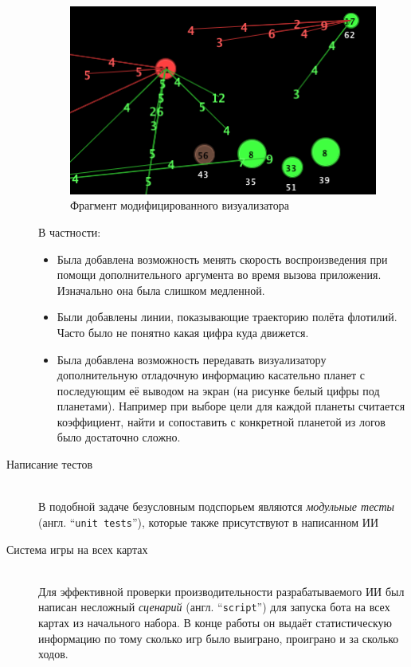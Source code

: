 \documentclass[12pt]{report}
\newenvironment{myItemize}{
	\begin{itemize}
  		\setlength{\itemsep}{1pt}
  		\setlength{\parskip}{0pt}
  		\setlength{\parsep}{0pt}
}{\end{itemize}}
\begin{document}
\begin{description}
\begin{figure}[h]
	\centering
	\includegraphics[scale=1]{modified_viz}
	\caption{Фрагмент модифицированного визуализатора}
	\label{fig:modif_viz}
\end{figure}
В частности: 
	\begin{myItemize}
	\item Была добавлена возможность менять скорость воспроизведения при помощи дополнительного аргумента во время вызова приложения. Изначально она была слишком медленной.
	\item Были добавлены линии, показывающие траекторию полёта флотилий. Часто было не понятно какая цифра куда движется.
	\item Была добавлена возможность передавать визуализатору дополнительную отладочную информацию касательно планет с последующим её выводом на экран (на рисунке белый цифры под планетами). Например при выборе цели для каждой планеты считается коэффициент, найти и сопоставить с конкретной планетой из логов было достаточно сложно.
	\end{myItemize}
\item[Написание тестов] \hfill \\ В подобной задаче безусловным подспорьем являются \emph{модульные тесты} (англ. ``\texttt{unit tests}''), которые также присутствуют в написанном ИИ
\item[Система игры на всех картах] \hfill \\
Для эффективной проверки производительности разрабатываемого ИИ был написан несложный \emph{сценарий} (англ. ``\texttt{script}'') для запуска бота на всех картах из начального набора. В конце работы он выдаёт статистическую информацию по тому сколько игр было выиграно, проиграно и за сколько ходов.
\end{description}
\end{document}
